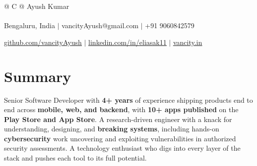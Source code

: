 \documentclass[a4paper,8pt]{article}
\begin{document}
\pagestyle{empty}


\begin{tabularx}{\linewidth}{@{} C @{}}
\color[HTML]{1C033C} \Huge{Ayush Kumar} \\[6pt]
\\
\textcolor[HTML]{371e77}{{{{\faMapMarker} Bengaluru, India}} $|$}
\textcolor[HTML]{371e77}{{{{\faEnvelope} vancityAyush@gmail.com}} $|$}
\textcolor[HTML]{371e77}{{{\faMobile} +91 9060842579}}

\textcolor[HTML]{371e77}{\underline{\href{https://github.com/vancityAyush}{\raisebox{-0.05\height}{\faGithub} github.com/vancityAyush}} $|$}
\textcolor[HTML]{371e77}{\underline{\href{https://linkedin.com/in/eliasak11}{\raisebox{-0.05\height}{\faLinkedin} linkedin.com/in/eliasak11}} $|$}
\textcolor[HTML]{371e77}{\underline{\href{https://vancity.in}{\raisebox{-0.05\height}{\faGlobe} vancity.in}}}
\end{tabularx}

\section{Summary}
\color[HTML]{1C033C}Senior Software Developer with \textbf{4+ years} of experience shipping products end to end across \textbf{mobile, web, and backend}, with \textbf{10+ apps published} on the \textbf{Play Store and App Store}. A research-driven engineer with a knack for understanding, designing, and \textbf{breaking systems}, including hands-on \textbf{cybersecurity} work uncovering and exploiting vulnerabilities in authorized security assessments. A technology enthusiast who digs into every layer of the stack and pushes each tool to its full potential.\\[3pt]

\end{document}
